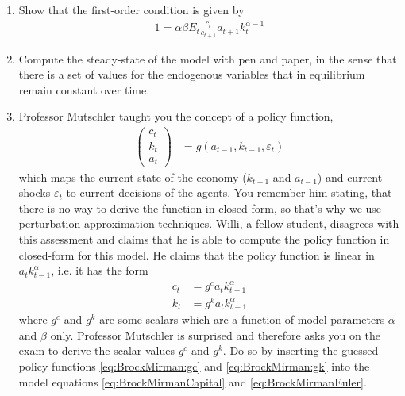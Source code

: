 \begin{enumerate}

\item Show that the first-order condition is given by
\begin{align}
1 = \alpha \beta E_t \frac{c_{t}}{c_{t+1}} a_{t+1} k_{t}^{\alpha-1} \label{eq:BrockMirmanEuler}
\end{align}

\item Compute the steady-state of the model with pen and paper,
  in the sense that there is a set of values for the endogenous variables that in equilibrium remain constant over time.

\item Professor Mutschler taught you the concept of a policy function,
\begin{align*}
\begin{pmatrix} c_{t}\\k_{t}\\a_{t} \end{pmatrix}
&= g(a_{t-1},k_{t-1},\varepsilon_{t})
\end{align*}	 
  which maps the current state of the economy ($k_{t-1}$ and $a_{t-1}$) and current shocks $\varepsilon_{t}$ to current decisions of the agents.
You remember him stating, that there is no way to derive the function in closed-form, so that's why we use perturbation approximation techniques.
Willi, a fellow student, disagrees with this assessment and claims that he is able to compute the policy function in closed-form for this model.
He claims that the policy function is linear in $ a_t k_{t-1}^\alpha$, i.e. it has the form
\begin{align}
c_{t} &= g^c a_t k_{t-1}^\alpha \label{eq:BrockMirman:gc}\\
k_{t} & = g^k a_t k_{t-1}^\alpha \label{eq:BrockMirman:gk}
\end{align}
where $g^c$ and $g^k$ are some scalars which are a function of model parameters $\alpha$ and $\beta$ only.
Professor Mutschler is surprised and therefore asks you on the exam to derive the scalar values $g^c$ and $g^k$.
Do so by inserting the guessed policy functions \eqref{eq:BrockMirman:gc} and \eqref{eq:BrockMirman:gk}
  into the model equations \eqref{eq:BrockMirmanCapital} and \eqref{eq:BrockMirmanEuler}.


\end{enumerate}
